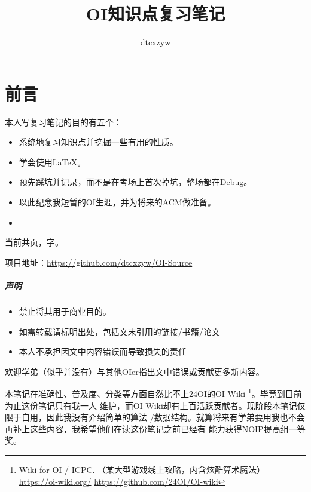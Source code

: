 \documentclass[10pt,b5paper,openany]{book}
\begin{document}

\title{OI知识点复习笔记}
\author{dtcxzyw}
\frontmatter
\maketitle
\chapter{前言}
本人写复习笔记的目的有五个：
\begin{itemize}
	\item 系统地复习知识点并挖掘一些有用的性质。
	\item 学会使用\LaTeX{}。
	\item 预先踩坑并记录，而不是在考场上首次掉坑，整场都在Debug。
	\item 以此纪念我短暂的OI生涯，并为将来的ACM做准备。
	\item {}
\end{itemize}

当前共\pageref{LastPage}页，字。

项目地址：\url{https://github.com/dtcxzyw/OI-Source}

\paragraph{声明}
{\bfseries
\begin{itemize}
    \item 禁止将其用于商业目的。
    \item 如需转载请标明出处，包括文末引用的链接/书籍/论文
    \item 本人不承担因文中内容错误而导致损失的责任
\end{itemize}
}

欢迎学弟（似乎并没有）与其他OIer指出文中错误或贡献更多新内容。

本笔记在准确性、普及度、分类等方面自然比不上24OI的OI-Wiki
\footnote{Wiki for OI / ICPC. （某大型游戏线上攻略，内含炫酷算术魔法）
\url{https://oi-wiki.org/}
\url{https://github.com/24OI/OI-wiki}}。毕竟到目前为止这份笔记只有我一人
维护，而OI-Wiki却有上百活跃贡献者。现阶段本笔记仅限于自用，因此我没有介绍简单的算法
/数据结构。就算将来有学弟要用我也不会再补上这些内容，我希望他们在读这份笔记之前已经有
能力获得NOIP提高组一等奖。

\renewcommand\contentsname{目录}
\tableofcontents
\mainmatter
\adjustmtc




















\appendix

\printindex

\backmatter

\end{document}
